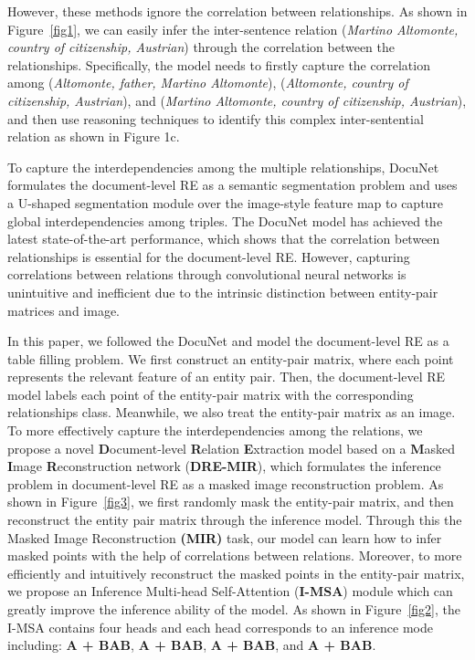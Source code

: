 \documentclass{article}
\begin{document}
However, these methods ignore the correlation between relationships.
As shown in Figure~\ref{fig1}, we can easily infer the inter-sentence relation (\textit{Martino Altomonte, country of citizenship, Austrian}) through the correlation between the relationships.
Specifically, the model needs to firstly capture the correlation among (\textit{Altomonte, father, Martino Altomonte}), (\textit{Altomonte, country of citizenship, Austrian}), and (\textit{Martino Altomonte, country of citizenship, Austrian}), and then use reasoning techniques to identify this complex inter-sentential relation as shown in Figure 1c.

To capture the interdependencies among the multiple relationships, DocuNet \cite{c:13} formulates the document-level RE as a semantic segmentation problem and uses a U-shaped segmentation module over the image-style feature map to capture global interdependencies among triples.
The DocuNet model has achieved the latest state-of-the-art performance, which shows that the correlation between relationships is essential for the document-level RE.
However, capturing correlations between relations through convolutional neural networks is unintuitive and inefficient due to the intrinsic distinction between entity-pair matrices and image.

In this paper, we followed the DocuNet and model the document-level RE as a table filling problem.
We first construct an entity-pair matrix, where each point represents the relevant feature of an entity pair.
Then, the document-level RE model labels each point of the entity-pair matrix with the corresponding relationships class.
Meanwhile, we also treat the entity-pair matrix as an image.
To more effectively capture the interdependencies among the relations, we propose a novel \textbf{D}ocument-level \textbf{R}elation \textbf{E}xtraction model based on a \textbf{M}asked \textbf{I}mage \textbf{R}econstruction network (\textbf{DRE-MIR}), which formulates the inference problem in document-level RE as a masked image reconstruction problem.
As shown in Figure~\ref{fig3}, we first randomly mask the entity-pair matrix, and then reconstruct the entity pair matrix through the inference model.
Through this the Masked Image Reconstruction \textbf{(MIR)} task, our model can learn how to infer masked points with the help of correlations between relations.
Moreover, to more efficiently and intuitively reconstruct the masked points in the entity-pair matrix, we propose an Inference Multi-head Self-Attention (\textbf{I-MSA}) module which can greatly improve the inference ability of the model.
As shown in Figure~\ref{fig2}, the I-MSA contains four heads and each head corresponds to an inference mode including: \textbf{A + BAB}, \textbf{A + BAB}, \textbf{A + BAB}, and  \textbf{A + BAB}. 
\end{document}
